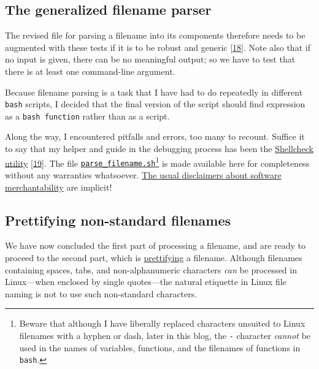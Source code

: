 \documentclass[
  a4paper,
]{article}
\begin{document}
\hypertarget{the-generalized-filename-parser}{%
\subsection{The generalized filename
parser}\label{the-generalized-filename-parser}}

The revised file for parsing a filename into its components therefore
needs to be augmented with these tests if it is to be robust and generic
\protect\hyperlink{ref-caveats}{{[}18{]}}. Note also that if no input is
given, there can be no meaningful output; so we have to test that there
is at least one command-line argument.

Because filename parsing is a task that I have had to do repeatedly in
different \texttt{bash} scripts, I decided that the final version of the
script should find expression as a \texttt{bash\ function} rather than
as a script.

Along the way, I encountered pitfalls and errors, too many to recount.
Suffice it to say that my helper and guide in the debugging process has
been the \href{https://www.shellcheck.net/}{Shellcheck utility}
\protect\hyperlink{ref-shellcheck}{{[}19{]}}. The file
\href{scripts/parse_filename.sh}{\texttt{parse\_filename.sh}}\footnote{Beware
  that although I have liberally replaced characters unsuited to Linux
  filenames with a hyphen or dash, later in this blog, the \texttt{-}
  character \emph{cannot} be used in the names of variables, functions,
  and the filenames of functions in \texttt{bash}.} is made available
here for completeness without any warranties whatsoever.
\href{https://core.ac.uk/download/pdf/267973227.pdf}{The usual
disclaimers about software merchantability} are implicit!
 \normalfont

\hypertarget{prettifying-non-standard-filenames}{%
\subsection{Prettifying non-standard
filenames}\label{prettifying-non-standard-filenames}}

We have now concluded the first part of processing a filename, and are
ready to proceed to the second part, which is
\href{https://www.thefreedictionary.com/prettifying}{prettifying} a
filename. Although filenames containing spaces, tabs, and
non-alphanumeric characters \emph{can} be processed in Linux---when
enclosed by single quotes---the natural etiquette in Linux file naming
is not to use such non-standard characters.
\end{document}
